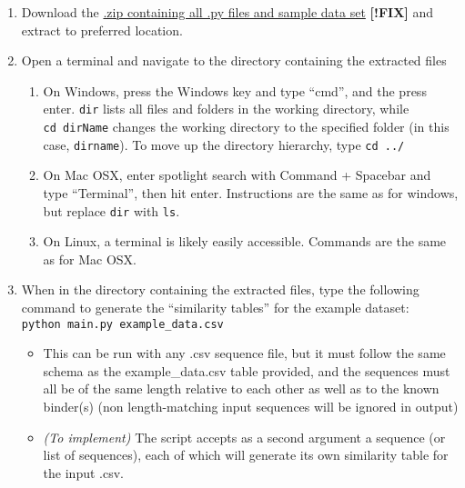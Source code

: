 \documentclass[]{article}
\begin{document}
\begin{enumerate}
\def\labelenumi{\arabic{enumi}.}
\item
  Download the \href{http://google.com}{.zip containing all .py files
  and sample data set} \textbf{{[}!FIX{]}} and extract to preferred
  location.
\item
  Open a terminal and navigate to the directory containing the extracted
  files

  \begin{enumerate}
  \def\labelenumii{\arabic{enumii}.}
  \item
    On Windows, press the Windows key and type ``cmd'', and the press
    enter. \texttt{dir} lists all files and folders in the working
    directory, while \texttt{cd\ dirName} changes the working directory
    to the specified folder (in this case, \texttt{dirname}). To move up
    the directory hierarchy, type \texttt{cd\ ../}
  \item
    On Mac OSX, enter spotlight search with Command + Spacebar and type
    ``Terminal'', then hit enter. Instructions are the same as for
    windows, but replace \texttt{dir} with \texttt{ls}.
  \item
    On Linux, a terminal is likely easily accessible. Commands are the
    same as for Mac OSX.
  \end{enumerate}
\item
  When in the directory containing the extracted files, type the
  following command to generate the ``similarity tables'' for the
  example dataset: \texttt{python\ main.py\ example\_data.csv}

  \begin{itemize}
  \item
    This can be run with any .csv sequence file, but it must follow the
    same schema as the example\_data.csv table provided, and the
    sequences must all be of the same length relative to each other as
    well as to the known binder(s) (non length-matching input sequences
    will be ignored in output)
  \item
    \emph{(To implement)} The script accepts as a second argument a
    sequence (or list of sequences), each of which will generate its own
    similarity table for the input .csv.


\end{itemize}
\end{enumerate}
\end{document}
